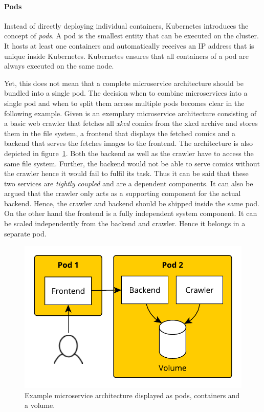 \paragraph{Pods}%
\label{par:Pods}
Instead of directly deploying individual containers, Kubernetes introduces the
concept of \textit{pods}. A pod is the smallest entity that can be executed on
the cluster. It hosts at least one containers and automatically receives an
\ac{IP} address that is unique inside Kubernetes. Kubernetes ensures that all
containers of a pod are always executed on the same node.

Yet, this does not mean that a complete microservice architecture should be
bundled into a single pod. The decision when to combine microservices into a
single pod and when to split them across multiple pods becomes clear in the
following example. Given is an exemplary microservice architecture consisting
of a basic web crawler that fetches all \textit{xkcd} comics from the xkcd
archive and stores them in the file system, a frontend that displays the
fetched comics and a backend that serves the fetches images to the frontend.
The architecture is also depicted in figure~\ref{fig:pods_example}. Both the
backend as well as the crawler have to access the same file system. Further,
the backend would not be able to serve comics without the crawler hence it
would fail to fulfil its task. Thus it can be said that these two services are
\textit{tightly coupled} and are a dependent components. It can also be argued
that the crawler only acts as a supporting component for the actual backend.
Hence, the crawler and backend should be shipped inside the same pod. On the
other hand the frontend is a fully independent system component. It can be
scaled independently from the backend and crawler. Hence it belongs in a
separate pod. 

\begin{figure}[H]
\begin{center}
  \includegraphics[scale=0.7]{images/figures/pod_example.pdf}
\end{center}
\caption{Example microservice architecture displayed as pods, containers and a volume.}%
\label{fig:pods_example}
\end{figure}


